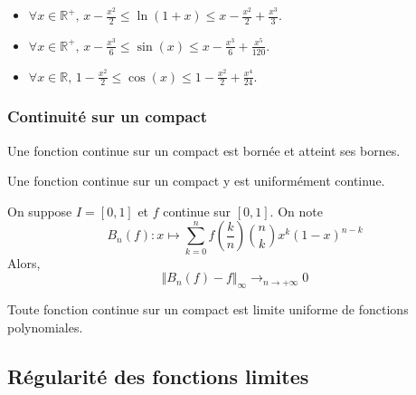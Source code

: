   \begin{application}
    \begin{itemize}
      \item $\forall x \in \mathbb{R}^+, \, x - \frac{x^2}{2} \leq \ln(1+x) \leq x - \frac{x^2}{2} + \frac{x^3}{3}$.
      \item $\forall x \in \mathbb{R}^+, \, x - \frac{x^3}{6} \leq \sin(x) \leq x - \frac{x^3}{6} + \frac{x^5}{120}$.
      \item $\forall x \in \mathbb{R}, \, 1 - \frac{x^2}{2} \leq \cos(x) \leq 1 - \frac{x^2}{2} + \frac{x^4}{24}$.
    \end{itemize}
  \end{application}

  \subsubsection{Continuité sur un compact}


  \begin{theorem}
    Une fonction continue sur un compact est bornée et atteint ses bornes.
  \end{theorem}

  \begin{theorem}
    Une fonction continue sur un compact y est uniformément continue.
  \end{theorem}


  \begin{theorem}
    On suppose $I = [0,1]$ et $f$ continue sur $[0,1]$. On note
    \[ B_n(f) : x \mapsto \sum_{k=0}^{n} f\left(\frac{k}{n}\right) \binom{n}{k} x^k (1-x)^{n-k} \]
    Alors,
    \[ \Vert B_n(f) - f \Vert_\infty \longrightarrow_{n \rightarrow +\infty} 0 \]
  \end{theorem}


  \begin{theorem}
    Toute fonction continue sur un compact est limite uniforme de fonctions polynomiales.
  \end{theorem}

  \subsection{Régularité des fonctions limites}

